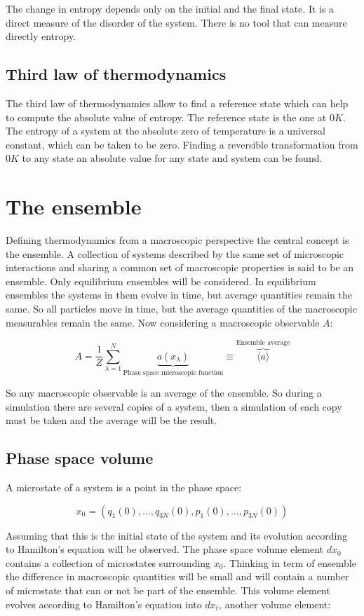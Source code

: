 	The change in entropy depends only on the initial and the final state.
	It is a direct measure of the disorder of the system.
	There is no tool that can measure directly entropy.

	\subsection{Third law of thermodynamics}
	The third law of thermodynamics allow to find a reference state which can help to compute the absolute value of entropy.
	The reference state is the one at $0K$.
	The entropy of a system at the absolute zero of temperature is a universal constant, which can be taken to be zero.
	Finding a reversible transformation from $0K$ to any state an absolute value for any state and system can be found.

\section{The ensemble}
Defining thermodynamics from a macroscopic perspective the central concept is the ensemble.
A collection of systems described by the same set of microscopic interactions and sharing a common set of macroscopic properties is said to be an ensemble.
Only equilibrium ensembles will be considered.
In equilibrium ensembles the systems in them evolve in time, but average quantities remain the same.
So all particles move in time, but the average quantities of the macroscopic measurables remain the same.
Now considering a macroscopic observable $A$:

$$A = \frac{1}{Z}\sum\limits_{\lambda=1}^N\underbrace{a(x_\lambda)}_{\text{Phase space microscopic function}}\equiv\overbrace{\langle a\rangle}^{\text{Ensemble average}}$$

So any macroscopic observable is an average of the ensemble.
So during a simulation there are several copies of a system, then a simulation of each copy must be taken and the average will be the result.

	\subsection{Phase space volume}
	A microstate of a system is a point in the phase space:

	$$x_0 = (q_1(0), \dots, q_{3N}(0), p_1(0), \dots, p_{3N}(0))$$

	Assuming that this is the initial state of the system and its evolution according to Hamilton's equation will be observed.
	The phase space volume element $dx_0$ contains a collection of microstates surrounding $x_0$.
	Thinking in term of ensemble the difference in macroscopic quantities will be small and will contain a number of microstate that can or not be part of the ensemble.
	This volume element evolves according to Hamilton's equation into $dx_t$, another volume element:

